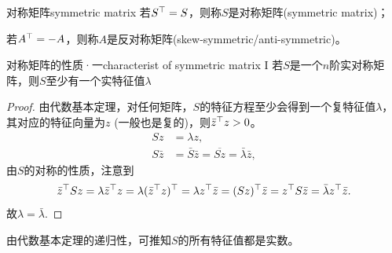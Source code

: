 \begin{definition}
	{对称矩阵}{symmetric matrix}
	若$S^\top = S$，则称$S$是对称矩阵(symmetric matrix)；
	
	若$A^\top = -A$，则称$A$是反对称矩阵(skew-symmetric/anti-symmetric)。
\end{definition}
\begin{theorem}{对称矩阵的性质·一}{characterist of symmetric matrix I}
	若$S$是一个$n$阶实对称矩阵，则$S$至少有一个实特征值$\lambda$
\end{theorem}
\begin{proof}
	由代数基本定理，对任何矩阵，$S$的特征方程至少会得到一个复特征值$\lambda$，其对应的特征向量为$z$ (一般也是复的)，则$\bar z^\top z > 0$。
	\begin{align*}
		Sz &= \lambda z,\\
		S\bar z &= \bar S\bar z = \overline{Sz} = \bar\lambda\bar z,
	\end{align*}
	由$S$的对称的性质，注意到
	\[
		\bar z^\top Sz = \lambda\bar z^\top z = \lambda(\bar z^\top z)^\top = \lambda z^\top\bar z = (Sz)^\top\bar z = z^\top S\bar z = \bar\lambda z^\top\bar z.
	\]
	故$\lambda = \bar\lambda$.
\end{proof}

\begin{corollary}
	由代数基本定理的递归性，可推知$S$的所有特征值都是实数。
\end{corollary}

